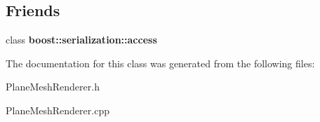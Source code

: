 \subsection*{Friends}
\begin{DoxyCompactItemize}
\item 
\hypertarget{class_plane_mesh_renderer_ac98d07dd8f7b70e16ccb9a01abf56b9c}{
class {\bfseries boost::serialization::access}}
\label{class_plane_mesh_renderer_ac98d07dd8f7b70e16ccb9a01abf56b9c}

\end{DoxyCompactItemize}


The documentation for this class was generated from the following files:\begin{DoxyCompactItemize}
\item 
PlaneMeshRenderer.h\item 
PlaneMeshRenderer.cpp\end{DoxyCompactItemize}
